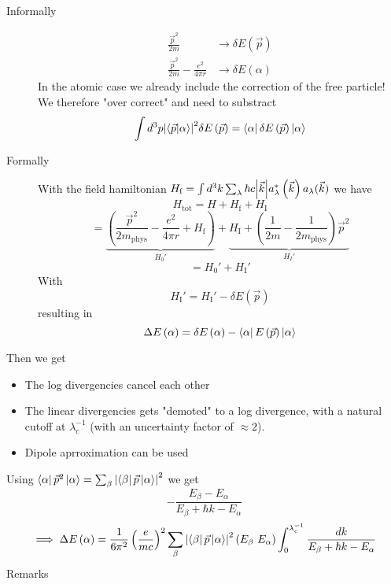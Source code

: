 \documentclass{report}
\begin{document}
\begin{description}
  \item[Informally] 
    \begin{align*}
      \frac{\vec{p}^2}{2m} &\to \delta E\left( \vec{p} \right) \\
      \frac{\vec{p}^2}{2m} - \frac{e^2}{4\pi r} &\to \delta E\left( \alpha \right) 
    \end{align*}
    In the atomic case we already include the correction of the free particle! We therefore "over correct" and need to substract \[
      \int d^{3}p \abs{\bra{\vec{p}}\ket{\alpha}}^2 \delta E\left( \vec{p} \right) = \bra{\alpha} \delta E\left( \vec{p} \right) \ket{\alpha}
    \] 
  \item[Formally] 
    With the field hamiltonian $H_\text{f} = \int d^{3}k \sum_{\lambda}^{} \hbar c \abs{\vec{k}} a_\lambda^*\left( \vec{k} \right) a_\lambda(\vec{k})$ we have
    \[
  H_{\text{tot}} = H + H_\text{f} + H_{\text{I}}
  \] \[
  = \underbrace{\left( \frac{\vec{p}^2}{2 m_{\text{phys}}} - \frac{e^2}{4\pi r} + H_{\text{f}} \right) }_{H_0'} + \underbrace{H_\text{I} + \left( \frac{1}{2m} - \frac{1}{2 m_\text{phys}} \right) \vec{p} ^2}_{H_I'}
  \] \[
  = H_0' + H_\text{I}'
  \] With \[
  H_\text{I}' = H_\text{I}' - \delta E\left( \vec{p} \right) 
  \] resulting in \[
  \Delta E\left( \alpha \right) = \delta E\left( \alpha \right) - \bra{\alpha} E\left( \vec{p} \right) \ket{\alpha}
  \] 
\end{description}
Then we get
\begin{itemize}
  \item The log divergencies cancel each other
  \item The linear divergencies gets "demoted" to a log divergence, with a natural cutoff at $\lambda_c^{-1}$ (with an uncertainty factor of $\approx 2$).
  \item Dipole aprroximation can be used
\end{itemize}
Using $\bra{\alpha} \vec{p}^2 \ket{\alpha} = \sum_{\beta}^{} \abs{\bra{\beta} \vec{p} \ket{\alpha}}^2$ we get \[
  -\frac{E_\beta- E_\alpha}{E_\beta + \hbar k - E_\alpha}
  \] 
  \[
    \implies  \Delta E\left( \alpha \right) = \frac{1}{6\pi^2} \left( \frac{e}{mc} \right) ^2 \sum_{\beta}^{} \abs{\bra{\beta} \vec{p} \ket{\alpha}}^2 \left( E_\beta \ E_\alpha \right) \int_0^{\lambda_c^{-1}} \frac{dk}{E_\beta + \hbar k - E_\alpha}
  \] 
Remarks
\end{document}
